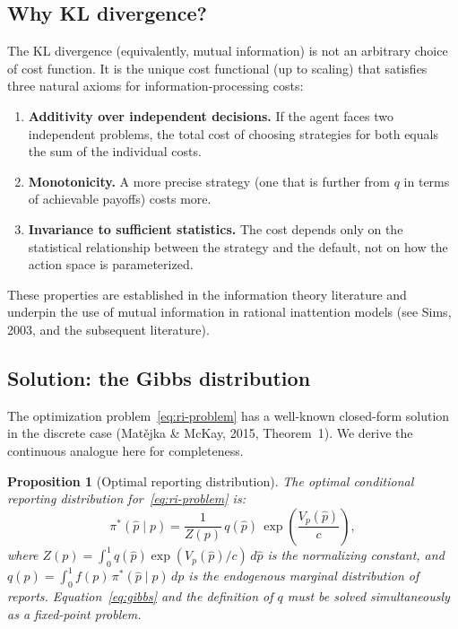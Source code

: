 \documentclass[11pt]{article}
\newtheorem{proposition}{Proposition}
\begin{document}
\subsection{Why KL divergence?}

The KL divergence (equivalently, mutual information) is not an arbitrary choice of cost function. It is the unique cost functional (up to scaling) that satisfies three natural axioms for information-processing costs:
\begin{enumerate}
\item \textbf{Additivity over independent decisions.} If the agent faces two independent problems, the total cost of choosing strategies for both equals the sum of the individual costs.
\item \textbf{Monotonicity.} A more precise strategy (one that is further from $q$ in terms of achievable payoffs) costs more.
\item \textbf{Invariance to sufficient statistics.} The cost depends only on the statistical relationship between the strategy and the default, not on how the action space is parameterized.
\end{enumerate}
These properties are established in the information theory literature and underpin the use of mutual information in rational inattention models (see Sims, 2003, and the subsequent literature).

\subsection{Solution: the Gibbs distribution}

The optimization problem~\eqref{eq:ri-problem} has a well-known closed-form solution in the discrete case (Mat\v{e}jka \& McKay, 2015, Theorem~1). We derive the continuous analogue here for completeness.

\begin{proposition}[Optimal reporting distribution]\label{prop:gibbs}
The optimal conditional reporting distribution for~\eqref{eq:ri-problem} is:
\begin{equation}\label{eq:gibbs}
\pi^*(\hat{p} \mid p) = \frac{1}{Z(p)} \, q(\hat{p}) \, \exp\!\left(\frac{V_p(\hat{p})}{c}\right),
\end{equation}
where $Z(p) = \int_0^1 q(\hat{p}) \exp(V_p(\hat{p})/c) \, d\hat{p}$ is the normalizing constant, and $q(\hat{p}) = \int_0^1 f(p)\,\pi^*(\hat{p} \mid p)\,dp$ is the endogenous marginal distribution of reports. Equation~\eqref{eq:gibbs} and the definition of $q$ must be solved simultaneously as a fixed-point problem.
\end{proposition}
\end{document}
